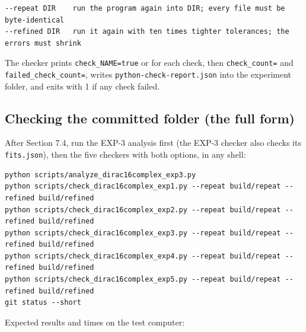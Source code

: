 \documentclass[11pt]{article}
\begin{document}
\begin{Verbatim}[fontsize=\small]
--repeat DIR    run the program again into DIR; every file must be byte-identical
--refined DIR   run it again with ten times tighter tolerances; the errors must shrink
\end{Verbatim}

The checker prints \texttt{check\_NA\allowbreak{}ME=true} or \texttt{} for each check, then \texttt{check\_co\allowbreak{}unt=} and \texttt{failed\_c\allowbreak{}heck\_cou\allowbreak{}nt=}, writes \texttt{python-c\allowbreak{}heck-rep\allowbreak{}ort.json} into the experiment folder, and exits with 1 if any check failed.

\subsection{Checking the committed folder (the full form)}

After Section 7.4, run the EXP-3 analysis first (the EXP-3 checker also checks its \texttt{fits.jso\allowbreak{}n}), then the five checkers with both options, in any shell:

\begin{Verbatim}[fontsize=\small]
python scripts/analyze_dirac16complex_exp3.py
python scripts/check_dirac16complex_exp1.py --repeat build/repeat --refined build/refined
python scripts/check_dirac16complex_exp2.py --repeat build/repeat --refined build/refined
python scripts/check_dirac16complex_exp3.py --repeat build/repeat --refined build/refined
python scripts/check_dirac16complex_exp4.py --repeat build/repeat --refined build/refined
python scripts/check_dirac16complex_exp5.py --repeat build/repeat --refined build/refined
git status --short
\end{Verbatim}

Expected results and times on the test computer:
\end{document}
